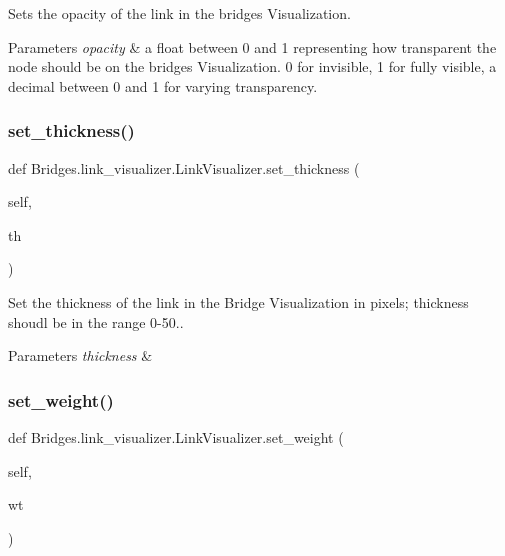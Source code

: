 Sets the opacity of the link in the bridges Visualization. 


\begin{DoxyParams}{Parameters}
{\em opacity} & a float between 0 and 1 representing how transparent the node should be on the bridges Visualization. 0 for invisible, 1 for fully visible, a decimal between 0 and 1 for varying transparency. \\
\hline
\end{DoxyParams}
\mbox{\label{class_bridges_1_1link__visualizer_1_1_link_visualizer_ad29bf7c34d1cfc37e57f98cd539d6a71}} 
\subsubsection{\texorpdfstring{set\+\_\+thickness()}{set\_thickness()}}
{\footnotesize\ttfamily def Bridges.\+link\+\_\+visualizer.\+Link\+Visualizer.\+set\+\_\+thickness (\begin{DoxyParamCaption}\item[{}]{self,  }\item[{}]{th }\end{DoxyParamCaption})}



Set the thickness of the link in the Bridge Visualization in pixels; thickness shoudl be in the range 0-\/50.. 


\begin{DoxyParams}{Parameters}
{\em thickness} & \\
\hline
\end{DoxyParams}
\mbox{\label{class_bridges_1_1link__visualizer_1_1_link_visualizer_ae439433344182c699ba4363e47de3949}} 
\subsubsection{\texorpdfstring{set\+\_\+weight()}{set\_weight()}}
{\footnotesize\ttfamily def Bridges.\+link\+\_\+visualizer.\+Link\+Visualizer.\+set\+\_\+weight (\begin{DoxyParamCaption}\item[{}]{self,  }\item[{}]{wt }\end{DoxyParamCaption})}



